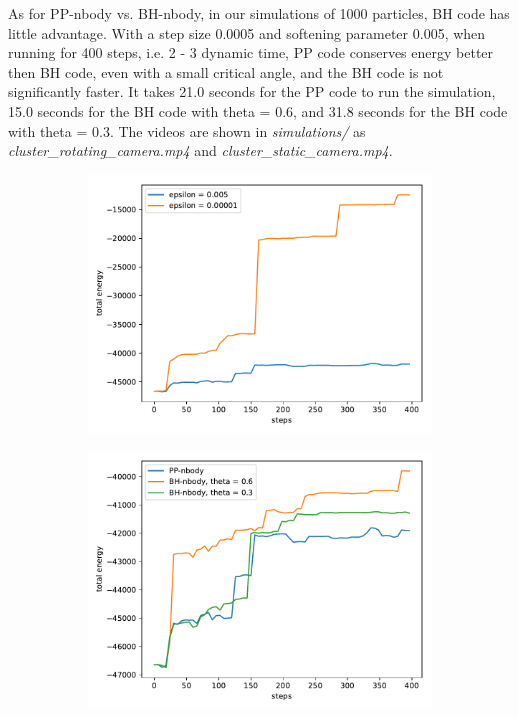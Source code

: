 As for PP-nbody vs. BH-nbody, in our simulations of 1000 particles, BH code has little advantage. With a step size 0.0005 and softening parameter 0.005, when running for 
400 steps, i.e. 2 - 3 dynamic time, PP code conserves energy better then BH code, even 
with a small critical angle, and the BH code is not significantly faster.
It takes 21.0 seconds for the PP code to run the simulation, 15.0 seconds for the BH code 
with theta = 0.6, and 31.8 seconds for the BH code with theta = 0.3.
The videos are shown in \textit{simulations/} as \textit{cluster\_rotating\_camera.mp4} and 
\textit{cluster\_static\_camera.mp4}.
\begin{figure}
		\centering
	\begin{subfigure}[b]{0.48\textwidth}
		\includegraphics[width=\columnwidth]{../simulations/energy_compare_epsilon}
		\label{fig:energycompareepsilon}
	\end{subfigure}
	\begin{subfigure}[b]{0.48\textwidth}
		\includegraphics[width=\columnwidth]{../simulations/energy_compare_PP_BH}

\end{subfigure}
\end{figure}

